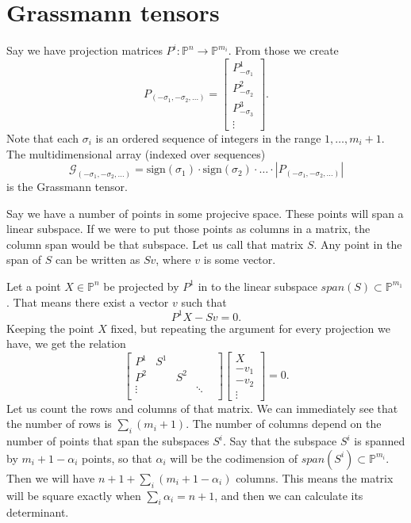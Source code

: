 \documentclass[a4paper,12pt]{book}
\theoremstyle{plain}
\theoremstyle{definition}
\begin{document}

\chapter{Grassmann tensors} %
\label{sec:grassmann_tensors}

Say we have projection matrices
\( P^i : \mathbb{P}^n \to \mathbb{P}^{m_i} \).
From those we create
\[ P_{(-\sigma_1, -\sigma_2, \ldots )} =
\begin{bmatrix}
	P_{-\sigma_1}^1 \\
	P_{-\sigma_2}^2 \\
	P_{-\sigma_3}^3 \\
	\vdots
\end{bmatrix}.
\]
Note that each \( \sigma_i \) is an ordered sequence of integers in the range
\( 1, \ldots, m_i + 1 \).
The multidimensional array (indexed over sequences)
\[
	\mathcal{G}_{(-\sigma_1, -\sigma_2,\ldots)} =
	\text{sign}(\sigma_1) \cdot \text{sign}(\sigma_2) \cdot \ldots \cdot
	|P_{(-\sigma_1, -\sigma_2, \ldots )} |
\]
is the Grassmann tensor.

Say we have a number of points in some projecive space. These points will
span a linear subspace. If we were to put those points as columns in a matrix,
the column span would be that subspace. Let us call that matrix \( S \).
Any point in the span of \( S \) can be written as \( S v \), where \( v \)
is some vector.

Let a point \( X \in \mathbb{P}^n \) be projected by \( P^1 \) in to the
linear subspace \( span(S) \subset \mathbb{P}^{m_1}  \). That means there
exist a vector \( v \) such that
\[
	P^1 X - S v = 0.
\]
Keeping the point \( X \) fixed, but repeating the argument for every projection
we have, we get the relation
\[
	\begin{bmatrix}
		P^1 & S^1 & & & \\
		P^2 & & S^2 & & \\
		\vdots & & & \ddots & \\
	\end{bmatrix}
	\begin{bmatrix}
		X \\ -v_1 \\ -v_2 \\ \vdots
	\end{bmatrix} = 0.
\]
Let us count the rows and columns of that matrix.
We can immediately see that the number of rows is \( \sum_i (m_i + 1) \).
The number of columns depend on the number of points that span the subspaces \( S^i \).
Say that the subspace \( S^i \) is spanned by \( m_i + 1 - \alpha_i \) points, so that
\( \alpha_i \) will be the codimension of \( span(S^i) \subset \mathbb{P}^{m_i} \).
Then we will have \( n + 1 + \sum_i (m_i + 1 - \alpha_i) \) columns.
This means the matrix will be square exactly when \( \sum_i \alpha_i = n + 1 \), and then we
can calculate its determinant.
\end{document}
